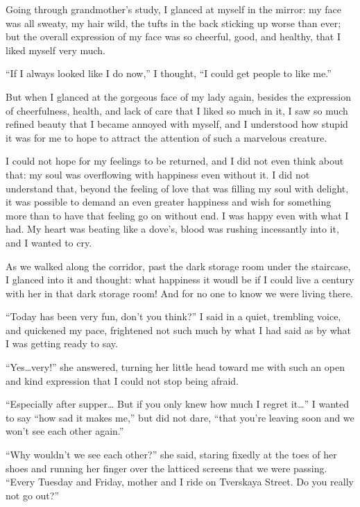 Going through grandmother's study, I glanced at myself in the mirror: my face was all sweaty, my hair wild, the tufts in the back sticking up worse than ever; but the overall expression of my face was so cheerful, good, and healthy, that I liked myself very much.

``If I always looked like I do now,'' I thought, ``I could get people to like me.'' %

But when I glanced at the gorgeous face of my lady again, besides the expression of cheerfulness, health, and lack of care that I liked so much in it, I saw so much refined beauty that I became annoyed with myself, and I understood how stupid it was for me to hope to attract the attention of such a marvelous creature.

I could not hope for my feelings to be returned, and I did not even think about that: my soul was overflowing with happiness even without it. I did not understand that, beyond the feeling of love that was filling my soul with delight, it was possible to demand an even greater happiness and wish for something more than to have that feeling go on without end. I was happy even with what I had. My heart was beating like a dove's, blood was rushing incessantly into it, and I wanted to cry.

As we walked along the corridor, past the dark storage room under the staircase, I glanced into it and thought: what happiness it woudl be if I could live a century with her in that dark storage room! And for no one to know we were living there.

``Today has been very fun, don't you think?'' I said in a quiet, trembling voice, and quickened my pace, frightened not such much by what I had said as by what I was getting ready to say. %

``Yes\ldots{}very!'' she answered, turning her little head toward me with such an open and kind expression that I could not stop being afraid. %

``Especially after supper\ldots{} But if you only knew how much I regret it\ldots{}'' I wanted to say ``how sad it makes me,'' but did not dare, ``that you're leaving soon and we won't see each other again.'' %

``Why wouldn't we see each other?'' she said, staring fixedly at the toes of her shoes and running her finger over the latticed screens that we were passing. ``Every Tuesday and Friday, mother and I ride on Tverskaya Street. Do you really not go out?'' %

